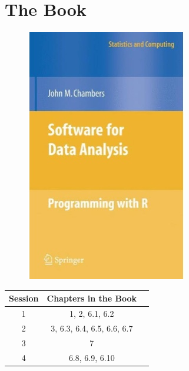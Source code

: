 \documentclass[15pt]{book}\usepackage[]{graphicx}\usepackage[]{color}
\begin{document}
  \section*{The Book}
    \begin{figure}[ht]
      \centering
      \includegraphics[width = 8 cm]{./viz/ext/book_intro_toR.jpeg}
    \end{figure}

    \begin{center}
      \begin{tabular}{ |c|c|c| } 
        \hline
          \textbf{\large Session} & \textbf{\large Chapters in the Book}  \\
        \hline   
          1 &  1, 2, 6.1, 6.2 \\
        \hline
          2 & 3, 6.3, 6.4, 6.5, 6.6, 6.7\\
        \hline  
          3 &  7 \\
        \hline
          4 & 6.8, 6.9, 6.10 \\
        \hline       
      \end{tabular}
    \end{center}
\end{document}
